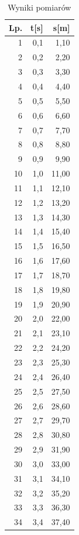 \documentclass{article}
\begin{document}
    \centering
    \begin{longtable}{|r|r|r|}  
    \caption{Wyniki pomiarów}  
    \label{Wyniki.pomiarów}  \\
    \hline
       \bf Lp. & \bf t[s] & \bf s[m]  \\ \hline
        1 & 0,1 & 1,10 \\ 
        2 & 0,2 & 2,20 \\ 
        3 & 0,3 & 3,30 \\ 
        4 & 0,4 & 4,40 \\ 
        5 & 0,5 & 5,50 \\ 
        6 & 0,6 & 6,60 \\ 
        7 & 0,7 & 7,70 \\ 
        8 & 0,8 & 8,80 \\ 
        9 & 0,9 & 9,90 \\ 
        10 & 1,0 & 11,00 \\ 
        11 & 1,1 & 12,10 \\ 
        12 & 1,2 & 13,20 \\ 
        13 & 1,3 & 14,30 \\ 
        14 & 1,4 & 15,40 \\ 
        15 & 1,5 & 16,50 \\ 
        16 & 1,6 & 17,60 \\ 
        17 & 1,7 & 18,70 \\ 
        18 & 1,8 & 19,80 \\ 
        19 & 1,9 & 20,90 \\ 
        20 & 2,0 & 22,00 \\ 
        21 & 2,1 & 23,10 \\ 
        22 & 2,2 & 24,20 \\ 
        23 & 2,3 & 25,30 \\ 
        24 & 2,4 & 26,40 \\ 
        25 & 2,5 & 27,50 \\ 
        26 & 2,6 & 28,60 \\ 
        27 & 2,7 & 29,70 \\ 
        28 & 2,8 & 30,80 \\ 
        29 & 2,9 & 31,90 \\ 
        30 & 3,0 & 33,00 \\ 
        31 & 3,1 & 34,10 \\ 
        32 & 3,2 & 35,20 \\ 
        33 & 3,3 & 36,30 \\ 
        34 & 3,4 & 37,40 \\ 

\end{longtable}
\end{document}
